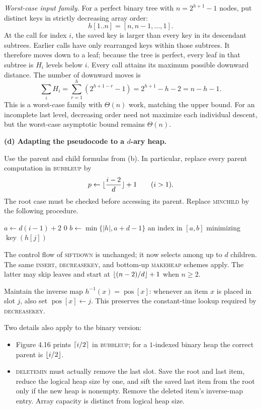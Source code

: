 \documentclass[11pt]{article}
\DeclarePairedDelimiter{\floor}{\lfloor}{\rfloor}
\DeclarePairedDelimiter{\ceil}{\lceil}{\rceil}
\newcommand{\key}{\operatorname{key}}
\newcommand{\pos}{\operatorname{pos}}
\begin{document}
\emph{Worst-case input family.}
For a perfect binary tree with $n=2^{h+1}-1$ nodes, put distinct keys in
strictly decreasing array order:
\[
  h[1..n]=[n,n-1,\ldots,1].
\]
At the call for index $i$, the saved key is larger than every key in
its descendant subtrees. Earlier calls have only rearranged keys within
those subtrees. It therefore moves down to a leaf; because the tree is
perfect, every leaf in that subtree is $H_i$ levels below $i$.
Every call attains its maximum possible downward distance.
The number of downward moves is
\[
  \sum_i H_i
  =\sum_{r=1}^{h}(2^{h+1-r}-1)
  =2^{h+1}-h-2=n-h-1.
\]
This is a worst-case family with $\Theta(n)$ work, matching the upper
bound. For an incomplete last level, decreasing order need not
maximize each individual descent, but the worst-case asymptotic
bound remains $\Theta(n)$.

\textbf{(d) Adapting the pseudocode to a $d$-ary heap.}

Use the parent and child formulas from (b). In particular, replace every
parent computation in \textsc{bubbleup} by
\[
   p\gets\floor{\frac{i-2}{d}}+1\qquad(i>1).
\]
The root case must be checked before accessing its parent.
Replace \textsc{minchild} by the following procedure.

\begin{algorithm}[H]
\caption{Smallest child in a $d$-ary heap}
\begin{algorithmic}[1]
  \State $a\gets d(i-1)+2$
   \State \Return $0$ \EndIf
  \State $b\gets\min\{|h|,a+d-1\}$
  \State \Return an index in $[a,b]$ minimizing $\key(h[j])$
\EndFunction
\end{algorithmic}
\end{algorithm}

The control flow of \textsc{siftdown} is unchanged; it now selects among
up to $d$ children. The same \textsc{insert}, \textsc{decreasekey}, and
bottom-up \textsc{makeheap} schemes apply. The latter may skip leaves
and start at $\floor{(n-2)/d}+1$ when $n\ge2$.

Maintain the inverse map $h^{-1}(x)=\pos[x]$: whenever an item $x$ is
placed in slot $j$, also set $\pos[x]\gets j$. This preserves the
constant-time lookup required by \textsc{decreasekey}.

Two details also apply to the binary version:
\begin{itemize}
\item Figure 4.16 prints $\ceil{i/2}$ in \textsc{bubbleup}; for a
  $1$-indexed binary heap the correct parent is $\floor{i/2}$.
\item \textsc{deletemin} must actually remove the last slot. Save the
  root and last item, reduce the logical heap size by one, and sift the
  saved last item from the root only if the new heap is nonempty.
  Remove the deleted item's inverse-map entry. Array capacity is
  distinct from logical heap size.
\end{itemize}
\end{document}
